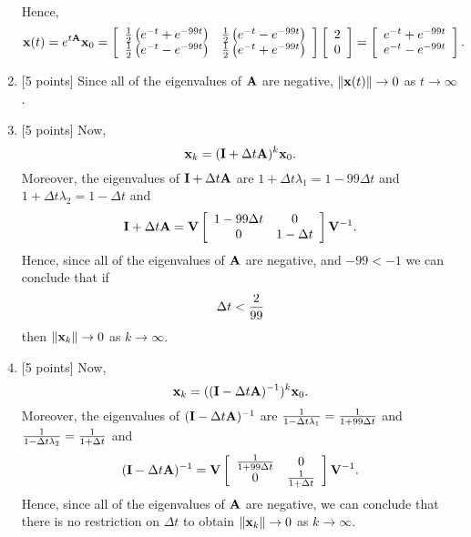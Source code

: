 \begin{solution}
\begin{enumerate}
\begin{eqnarray*}
\end{eqnarray*}
Hence,
\[
{\bf x}(t) = e^{t{\bf A}} {\bf x}_0 = \left[\begin{array}{cc}{1\over2}\left(e^{-t}+e^{-99t}\right) & {1\over2}\left(e^{-t} - e^{-99t}\right) \\ {1\over2}\left(e^{-t}-e^{-99t}\right) & {1\over2}\left(e^{-t}+e^{-99t}\right)\end{array}\right]\left[\begin{array}{c}2 \\ 0\end{array}\right] = \left[\begin{array}{c}e^{-t}+e^{-99t} \\ e^{-t}-e^{-99t}\end{array}\right].
\]

\item {[5 points]} Since all of the eigenvalues of ${\bf A}$ are negative, $\|{\bf x}(t)\|\rightarrow0$ as $t\rightarrow\infty$.

\item {[5 points]} Now,
\[
{\bf x}_k = ({\bf I}+\Delta t {\bf A})^k {\bf x}_0.
\]
Moreover, the eigenvalues of ${\bf I}+\Delta t {\bf A}$ are $1+\Delta t \lambda_1 = 1-99\Delta t$ and $1+\Delta t \lambda_2 = 1-\Delta t$ and
\[
{\bf I}+\Delta t {\bf A}={\bf V} \left[\begin{array}{cc}1-99\Delta t & 0 \\ 0 & 1-\Delta t\end{array}\right] {\bf V}^{-1}.
\]
Hence, since all of the eigenvalues of ${\bf A}$ are negative, and $-99<-1$ we can conclude that if
\[
\Delta t<{2\over 99}
\]
then $\|{\bf x}_k\|\rightarrow0$ as $k\to\infty$.

\item {[5 points]} Now,
\[
{\bf x}_k = (({\bf I}-\Delta t {\bf A})^{-1})^k {\bf x}_0.
\]
Moreover, the eigenvalues of $({\bf I}-\Delta t{\bf A})^{-1}$ are ${1\over 1-\Delta t \lambda_1} = {1\over 1+99\Delta t}$ and ${1\over 1-\Delta t \lambda_2} = {1\over 1+\Delta t}$ and
\[
({\bf I}-\Delta t{\bf A})^{-1}={\bf V} \left[\begin{array}{cc}{1\over 1+99\Delta t} & 0 \\ 0 & {1\over 1+\Delta t}\end{array}\right] {\bf V}^{-1}.
\]
Hence, since all of the eigenvalues of ${\bf A}$ are negative, we can conclude that there is no restriction on $\Delta t$ to obtain $\|{\bf x}_k\|\rightarrow0$ as $k\to\infty$.
\end{enumerate}
\end{solution}